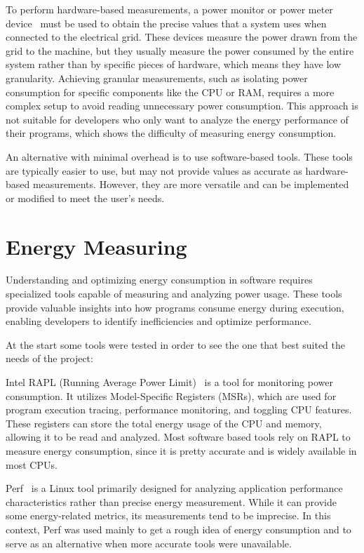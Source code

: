 To perform hardware-based measurements, a power monitor or power meter device~\cite{hackenberg2013power,ge2009powerpack} must be used to obtain the precise values that a system uses when connected to the electrical grid. These devices measure the power drawn from the grid to the machine, but they usually measure the power consumed by the entire system rather than by specific pieces of hardware, which means they have low granularity. Achieving granular measurements, such as isolating power consumption for specific components like the CPU or RAM, requires a more complex setup to avoid reading unnecessary power consumption. This approach is not suitable for developers who only want to analyze the energy performance of their programs, which shows the difficulty of measuring energy consumption.

An alternative with minimal overhead is to use software-based tools. These tools are typically easier to use, but may not provide values as accurate as hardware-based measurements. However, they are more versatile and can be implemented or modified to meet the user's needs. 


\section{Energy Measuring} \label{sec:background_energy}

Understanding and optimizing energy consumption in software requires specialized tools capable of measuring and analyzing power usage. These tools provide valuable insights into how programs consume energy during execution, enabling developers to identify inefficiencies and optimize performance.

At the start some tools were tested in order to see the one that best suited the needs of the project:

Intel RAPL (Running Average Power Limit)~\cite{intel_rapl} is a tool for monitoring power consumption. It utilizes Model-Specific Registers (MSRs), which are used for program execution tracing, performance monitoring, and toggling CPU features. These registers can store the total energy usage of the CPU and memory, allowing it to be read and analyzed. Most software based tools rely on RAPL to measure energy consumption, since it is pretty accurate and is widely available in most CPUs.

Perf~\cite{perfwiki_main} is a Linux tool primarily designed for analyzing application performance characteristics rather than precise energy measurement. While it can provide some energy-related metrics, its measurements tend to be imprecise. In this context, Perf was used mainly to get a rough idea of energy consumption and to serve as an alternative when more accurate tools were unavailable.

